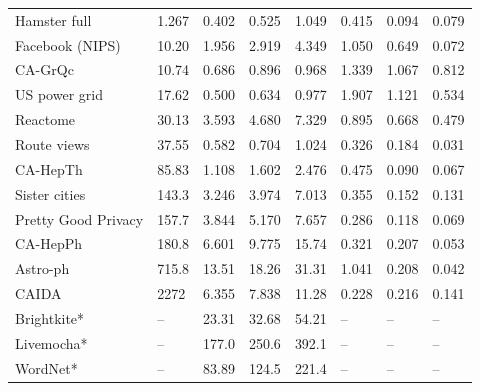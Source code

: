 \documentclass[10pt,twocolumn,twoside]{IEEEtran}
\begin{document}
\begin{table}[htbp]
\begin{threeparttable}
\begin{tabularx}{8.75cm}{p{1.75cm}<{\centering} p{0.6cm}<{\centering} p{0.4cm}<{\centering} p{0.4cm}<{\centering} p{0.4cm}<{\centering} p{0.4cm}<{\centering} p{0.4cm}<{\centering} p{0.4cm}<{\centering}}
            Hamster full                                                       & 1.267 & 0.402   & 0.525    & 1.049   & 0.415 & 0.094 & 0.079 \\
            Facebook (NIPS)                                                    & 10.20 & 1.956   & 2.919    & 4.349   & 1.050 & 0.649 & 0.072 \\
            CA-GrQc                                                            & 10.74 & 0.686   & 0.896    & 0.968   & 1.339 & 1.067 & 0.812 \\
            US power grid                                                      & 17.62 & 0.500   & 0.634    & 0.977   & 1.907 & 1.121 & 0.534 \\
            Reactome                                                           & 30.13 & 3.593   & 4.680    & 7.329   & 0.895 & 0.668 & 0.479 \\
            Route views                                                        & 37.55 & 0.582   & 0.704    & 1.024   & 0.326 & 0.184 & 0.031 \\
            CA-HepTh                                                           & 85.83 & 1.108   & 1.602    & 2.476   & 0.475 & 0.090 & 0.067 \\
            Sister cities                                                      & 143.3 & 3.246   & 3.974    & 7.013   & 0.355 & 0.152 & 0.131 \\
            Pretty Good Privacy                                                & 157.7 & 3.844   & 5.170    & 7.657   & 0.286 & 0.118 & 0.069 \\
            CA-HepPh                                                           & 180.8 & 6.601   & 9.775    & 15.74   & 0.321 & 0.207 & 0.053 \\
            Astro-ph                                                           & 715.8 & 13.51   & 18.26    & 31.31   & 1.041 & 0.208 & 0.042 \\
            CAIDA                                                              & 2272  & 6.355   & 7.838    & 11.28   & 0.228 & 0.216 & 0.141 \\
            Brightkite*                                                        & --    & 23.31   & 32.68    & 54.21   & --    & --    & --    \\
            Livemocha*                                                         & --    & 177.0   & 250.6    & 392.1   & --    & --    & --    \\
            WordNet*                                                           & --    & 83.89   & 124.5    & 221.4   & --    & --    & --    \\

\end{tabularx}
\end{threeparttable}
\end{table}
\end{document}
